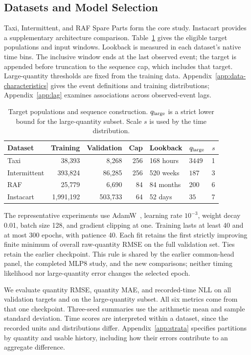 \documentclass[runningheads]{llncs}
\begin{document}
\subsection{Datasets and Model Selection}
Taxi, Intermittent, and RAF Spare Parts form the core study. Instacart provides a supplementary architecture comparison. Table~\ref{tab:data} gives the eligible target populations and input windows. Lookback is measured in each dataset's native time bins. The inclusive window ends at the last observed event; the target is appended before truncation to the sequence cap, which includes that target. Large-quantity thresholds are fixed from the training data. Appendix~\ref{app:data-characteristics} gives the event definitions and training distributions; Appendix~\ref{app:lag} examines associations across observed-event lags.

\begin{table}[t]
\caption{Target populations and sequence construction. $q_{\rm large}$ is a strict lower bound for the large-quantity subset. Scale $s$ is used by the time distribution.}
\label{tab:data}
\centering\small
\setlength{\tabcolsep}{4pt}
\begin{tabular}{@{}lrrrllr@{}}
\toprule
Dataset & Training & Validation & Cap & Lookback & $q_{\rm large}$ & $s$\\
\midrule
Taxi & 38,393 & 8,268 & 256 & 168 hours & $3449$ & 1\\
Intermittent & 393,824 & 86,285 & 256 & 520 weeks & $187$ & 3\\
RAF & 25,779 & 6,690 & 84 & 84 months & $200$ & 6\\
Instacart & 1,991,192 & 503,733 & 64 & 52 days & $35$ & 7\\
\bottomrule
\end{tabular}
\end{table}

The representative experiments use AdamW~\cite{loshchilov2019adamw}, learning rate $10^{-3}$, weight decay 0.01, batch size 128, and gradient clipping at one. Training lasts at least 40 and at most 300 epochs, with patience 40. Each fit retains the first strictly improving finite minimum of overall raw-quantity RMSE on the full validation set. Ties retain the earlier checkpoint. This rule is shared by the earlier common-head panel, the completed MLP8 study, and the new comparisons; neither timing likelihood nor large-quantity error changes the selected epoch.

We evaluate quantity RMSE, quantity MAE, and recorded-time NLL on all validation targets and on the large-quantity subset. All six metrics come from that one checkpoint. Three-seed summaries use the arithmetic mean and sample standard deviation. Time scores are interpreted within a dataset, since the recorded units and distributions differ. Appendix~\ref{app:strata} specifies partitions by quantity and usable history, including how their errors contribute to an aggregate difference.
\end{document}
